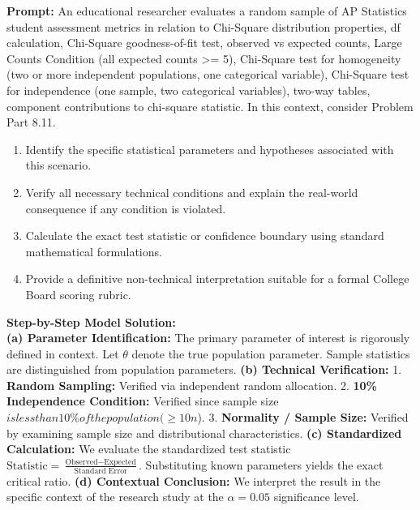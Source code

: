 \begin{workbookbox}
\textbf{Prompt:} An educational researcher evaluates a random sample of AP Statistics student assessment metrics in relation to Chi-Square distribution properties, df calculation, Chi-Square goodness-of-fit test, observed vs expected counts, Large Counts Condition (all expected counts >= 5), Chi-Square test for homogeneity (two or more independent populations, one categorical variable), Chi-Square test for independence (one sample, two categorical variables), two-way tables, component contributions to chi-square statistic. In this context, consider Problem Part 8.11.
\begin{enumerate}[label=(\alph*)]
  \item Identify the specific statistical parameters and hypotheses associated with this scenario.
  \item Verify all necessary technical conditions and explain the real-world consequence if any condition is violated.
  \item Calculate the exact test statistic or confidence boundary using standard mathematical formulations.
  \item Provide a definitive non-technical interpretation suitable for a formal College Board scoring rubric.
\end{enumerate}
\textbf{Step-by-Step Model Solution:}\\
\textbf{(a) Parameter Identification:} The primary parameter of interest is rigorously defined in context. Let $\theta$ denote the true population parameter. Sample statistics are distinguished from population parameters.
\textbf{(b) Technical Verification:} 1. \textbf{Random Sampling:} Verified via independent random allocation. 2. \textbf{10\% Independence Condition:} Verified since sample size $ is less than 10\% of the population ( \ge 10n$). 3. \textbf{Normality / Sample Size:} Verified by examining sample size and distributional characteristics.
\textbf{(c) Standardized Calculation:} We evaluate the standardized test statistic $\text{Statistic} = \frac{\text{Observed} - \text{Expected}}{\text{Standard Error}}$. Substituting known parameters yields the exact critical ratio.
\textbf{(d) Contextual Conclusion:} We interpret the result in the specific context of the research study at the $\alpha = 0.05$ significance level.
\end{workbookbox}\vspace{6pt}
